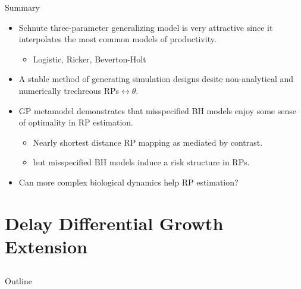 \documentclass[ xcolor = pdftex, dvipsnames, table ]{beamer}
\begin{document}
\begin{frame}{Summary}
\begin{itemize}
\setlength\itemsep{1em}
        \item Schnute three-parameter generalizing model is very attractive since it  
	interpolates the most common models of productivity. 
	\begin{itemize}
		\item Logistic, Ricker, Beverton-Holt
	\end{itemize}
        \item A stable method of generating simulation designs desite non-analytical 
	and numerically trechreous RPs$\leftrightarrow\theta$.	
	\item GP metamodel demonstrates that misspecified BH models enjoy some sense of optimality in RP estimation.
	\begin{itemize}
	 	\item Nearly shortest distance RP mapping as mediated by contrast.
		\item but misspecified BH models induce a risk structure in RPs.
	\end{itemize}
	\item Can more complex biological dynamics help RP estimation?
\end{itemize}

\end{frame}

%
\section{Delay Differential Growth Extension}
\subsection{}
\begin{frame}{Outline}
\end{frame}
\end{document}
